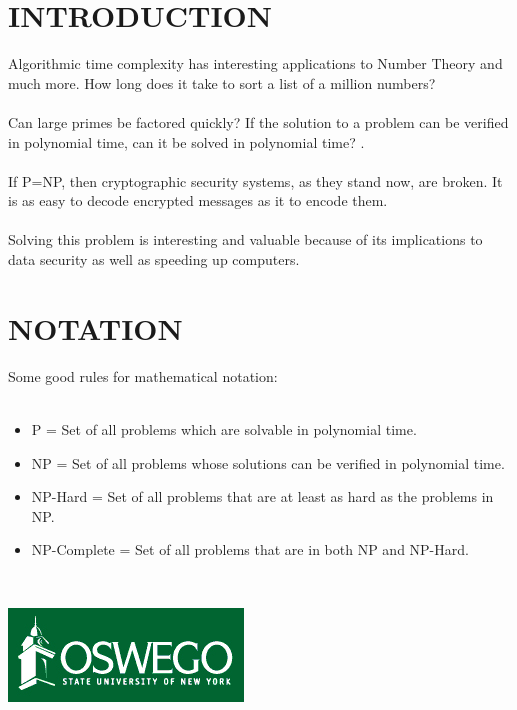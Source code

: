 \documentclass[landscape]{sciposter}
\begin{document}
\begin{multicols}{4}

\section*{INTRODUCTION}

Algorithmic time complexity has interesting applications to Number Theory and much more.  How long does it take to sort a list of a million numbers?  
\\
\\
Can  large primes be factored quickly?  If the solution to a problem can be verified in polynomial time, can it be solved in polynomial time?  \cite{CD}.
\\
\\
If P=NP, then cryptographic security systems, as they stand now, are broken.  It is as easy to decode encrypted messages as it to encode them.
\\
\\
Solving this problem is interesting and valuable because of its implications to data security as well as speeding up computers.
\section{NOTATION}

Some good rules for mathematical notation:
\\
\\
\begin{itemize}
\item P = Set of all problems which are solvable in polynomial time.
\item NP = Set of all problems whose solutions can be verified in polynomial time.
\item NP-Hard = Set of all problems that are at least as hard as the problems in NP.
\item NP-Complete = Set of all problems that are in both NP and NP-Hard.
\end{itemize}

\

\begin{center}
\includegraphics[scale = 2.6]{oswegologo}
\end{center}


\end{multicols}
\end{document}
